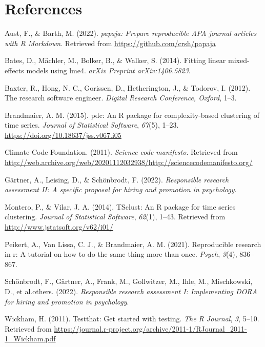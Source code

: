 \documentclass[
  man]{apa6}
\newlength{\cslhangindent}
\newlength{\cslentryspacingunit} %
\newenvironment{CSLReferences}[2] %
 {%
  \setlength{\parindent}{0pt}
  \ifodd #1
  \let\oldpar\par
  \def\par{\hangindent=\cslhangindent\oldpar}
  \fi
  \setlength{\parskip}{#2\cslentryspacingunit}
 }%
 {}
\begin{document}
\newpage

\hypertarget{references}{%
\section{References}\label{references}}

\hypertarget{refs}{}
\begin{CSLReferences}{1}{0}
\leavevmode{}%
Aust, F., \& Barth, M. (2022). \emph{{papaja}: {Prepare} reproducible {APA} journal articles with {R Markdown}}. Retrieved from \url{https://github.com/crsh/papaja}

\leavevmode{}%
Bates, D., Mächler, M., Bolker, B., \& Walker, S. (2014). Fitting linear mixed-effects models using lme4. \emph{arXiv Preprint arXiv:1406.5823}.

\leavevmode{}%
Baxter, R., Hong, N. C., Gorissen, D., Hetherington, J., \& Todorov, I. (2012). The research software engineer. \emph{Digital Research Conference, Oxford}, 1--3.

\leavevmode{}%
Brandmaier, A. M. (2015). {pdc}: An {R} package for complexity-based clustering of time series. \emph{Journal of Statistical Software}, \emph{67}(5), 1--23. \url{https://doi.org/10.18637/jss.v067.i05}

\leavevmode{}%
Climate Code Foundation. (2011). \emph{Science code manifesto}. Retrieved from \url{http://web.archive.org/web/20201112032938/http://sciencecodemanifesto.org/}

\leavevmode{}%
Gärtner, A., Leising, D., \& Schönbrodt, F. (2022). \emph{Responsible research assessment {II}: A specific proposal for hiring and promotion in psychology}.

\leavevmode{}%
Montero, P., \& Vilar, J. A. (2014). {TSclust}: An {R} package for time series clustering. \emph{Journal of Statistical Software}, \emph{62}(1), 1--43. Retrieved from \url{http://www.jstatsoft.org/v62/i01/}

\leavevmode{}%
Peikert, A., Van Lissa, C. J., \& Brandmaier, A. M. (2021). Reproducible research in r: A tutorial on how to do the same thing more than once. \emph{Psych}, \emph{3}(4), 836--867.

\leavevmode{}%
Schönbrodt, F., Gärtner, A., Frank, M., Gollwitzer, M., Ihle, M., Mischkowski, D., et al.others. (2022). \emph{Responsible research assessment {I}: Implementing {DORA} for hiring and promotion in psychology}.

\leavevmode{}%
Wickham, H. (2011). Testthat: Get started with testing. \emph{The R Journal}, \emph{3}, 5--10. Retrieved from \url{https://journal.r-project.org/archive/2011-1/RJournal_2011-1_Wickham.pdf}

\end{CSLReferences}
\end{document}
